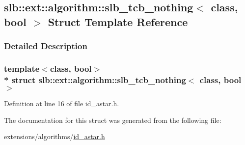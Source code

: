 \hypertarget{structslb_1_1ext_1_1algorithm_1_1slb__tcb__nothing}{}\subsection{slb\+:\+:ext\+:\+:algorithm\+:\+:slb\+\_\+tcb\+\_\+nothing$<$ class, bool $>$ Struct Template Reference}
\label{structslb_1_1ext_1_1algorithm_1_1slb__tcb__nothing}


\subsubsection{Detailed Description}
\subsubsection*{template$<$class, bool$>$\\*
struct slb\+::ext\+::algorithm\+::slb\+\_\+tcb\+\_\+nothing$<$ class, bool $>$}



Definition at line 16 of file id\+\_\+astar.\+h.



The documentation for this struct was generated from the following file\+:\begin{DoxyCompactItemize}
\item 
extensions/algorithms/\hyperlink{id__astar_8h}{id\+\_\+astar.\+h}\end{DoxyCompactItemize}
